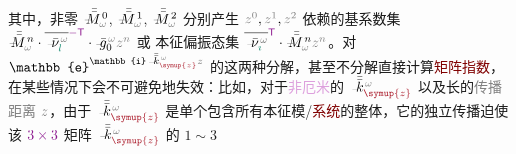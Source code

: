 其中，非零 $\Xint{\mathcolor{gray}{-}}{18}{\bar{\bar{M}}}_{\mathcolor{gray}{\omega}}^{\;\! 0}$, $\Xint{\mathcolor{gray}{-}}{18}{\bar{\bar{M}}}_{\mathcolor{gray}{\omega}}^{\;\! 1}$, $\Xint{\mathcolor{gray}{-}}{18}{\bar{\bar{M}}}_{\mathcolor{gray}{\omega}}^{\;\! 2}$ 分别产生 $\mathcolor{gray}{z^0}, \mathcolor{gray}{z^1}, \mathcolor{gray}{z^2}$ 依赖的\textcolor{PineGreen}{基系数集} $\Xint{\mathcolor{gray}{-}}{18}{\bar{\bar{M}}}_{\mathcolor{gray}{\omega}}^{\;\! n} \cdot \overline{\Xint{\begin{smallmatrix} ~ \\ {}^{}_{\mathcolor{gray}{-}} \\ ~ \end{smallmatrix}}{15}{\bar{\nu}}^{\;\!\mathcolor{gray}{\omega}}_{\textcolor{PineGreen}{l}}}^{\textcolor{Plum}{-\mathsf{T}}} \cdot \Xint{{}^{}_{\mathcolor{gray}{-}}}{10}{\bar{g}}^{\;\!\mathcolor{gray}{\omega}}_0 \mathcolor{gray}{z^n}$ 或 \textcolor{PineGreen}{本征偏振态集} $\overline{\Xint{\begin{smallmatrix} ~ \\ {}^{}_{\mathcolor{gray}{-}} \\ ~ \end{smallmatrix}}{15}{\bar{\nu}}^{\;\!\mathcolor{gray}{\omega}}_{\textcolor{PineGreen}{\imath}}}^{\mathsf{\textcolor{Plum}{T}}} \cdot \Xint{\mathcolor{gray}{-}}{18}{\bar{\bar{M}}}_{\mathcolor{gray}{\omega}}^{\;\! n} \mathcolor{gray}{z^n}$。对 $\mathbb{e}^{\mathbb{i} \Xint{\begin{smallmatrix} ~ \\ {}^{}_{\mathcolor{gray}{-}} \\ ~ \end{smallmatrix}}{15}{\bar{\bar{k}}}_{\textcolor{Maroon}{\symup{z}}}^{\;\! \mathcolor{gray}{\omega}} \mathcolor{gray}{z}}$ 的这两种分解，甚至不分解直接计算\textcolor{Maroon}{矩阵指数}\cite{zarifiPlaneWaveReflection2014}，在某些情况下会不可避免地失效：比如，对于\textcolor{Plum}{非厄米}的 $\Xint{\begin{smallmatrix} ~ \\ {}^{}_{\mathcolor{gray}{-}} \\ ~ \end{smallmatrix}}{15}{\bar{\bar{k}}}_{\textcolor{Maroon}{\symup{z}}}^{\;\! \mathcolor{gray}{\omega}}$ 以及长的\textcolor{gray}{传播距离} $\mathcolor{gray}{z}$，由于 $\Xint{\begin{smallmatrix} ~ \\ {}^{}_{\mathcolor{gray}{-}} \\ ~ \end{smallmatrix}}{15}{\bar{\bar{k}}}_{\textcolor{Maroon}{\symup{z}}}^{\;\! \mathcolor{gray}{\omega}}$ 是单个包含所有\textcolor{PineGreen}{本征模}/\textcolor{Maroon}{系统}的整体，它的独立传播迫使该 $\textcolor{Plum}{3 \times 3}$ 矩阵 $\Xint{\begin{smallmatrix} ~ \\ {}^{}_{\mathcolor{gray}{-}} \\ ~ \end{smallmatrix}}{15}{\bar{\bar{k}}}_{\textcolor{Maroon}{\symup{z}}}^{\;\! \mathcolor{gray}{\omega}}$ 的 $1\sim3$ 